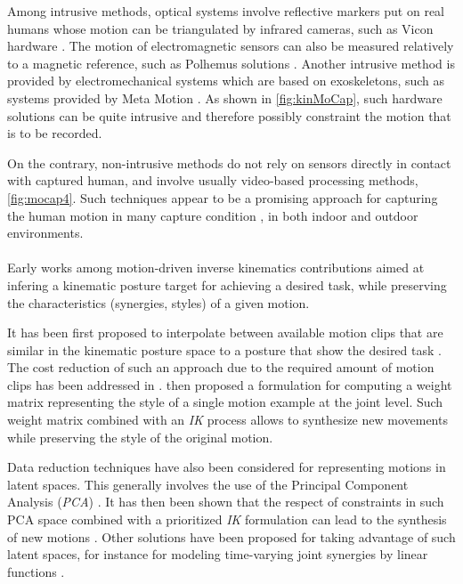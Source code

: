 Among intrusive methods, optical systems involve reflective markers put on real humans whose motion can be triangulated by infrared cameras, such as Vicon hardware . The motion of electromagnetic sensors can also be measured relatively to a magnetic reference, such as Polhemus solutions . Another intrusive method is provided by electromechanical systems which are based on exoskeletons, such as systems provided by Meta Motion . As shown in \myfigname \ref{fig:kinMoCap}, such hardware solutions can be quite intrusive and therefore possibly constraint the motion that is to be recorded.

On the contrary, non-intrusive methods do not rely on sensors directly in contact with captured human, and involve usually video-based processing methods, \myfigname \ref{fig:mocap4}. Such techniques appear to be a promising approach for capturing the human motion in many capture condition , in both indoor and outdoor environments.\\


						\\

Early works among motion-driven inverse kinematics contributions aimed at infering a kinematic posture target for achieving a desired task, while preserving the characteristics (synergies, styles) of a given motion.

It has been first proposed to interpolate between available motion clips that are similar in the kinematic posture space to a posture that show the desired task . The cost reduction of such an approach due to the required amount of motion clips has been addressed in .  then proposed a formulation for computing a weight matrix representing the style of a single motion example at the joint level. Such weight matrix combined with an \emph{IK} process allows to synthesize new movements while preserving the style of the original motion.


Data reduction techniques have also been considered for representing motions in latent spaces. This generally involves the use of the Principal Component Analysis (\emph{PCA}) . It has then been shown that the respect of constraints in such PCA space combined with a prioritized \emph{IK} formulation can lead to the synthesis of new motions . Other solutions have been proposed for taking advantage of such latent spaces, for instance for modeling time-varying joint synergies by linear functions .\\ %


